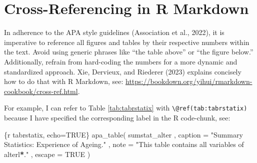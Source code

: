 \documentclass[
  doc]{apa6}
\newenvironment{Shaded}{\begin{snugshade}}{\end{snugshade}}
\newcommand{\AttributeTok}[1]{\textcolor[rgb]{0.13,0.29,0.53}{#1}}
\newcommand{\NormalTok}[1]{#1}
\newcommand{\SpecialCharTok}[1]{\textcolor[rgb]{0.81,0.36,0.00}{\textbf{#1}}}
\newcommand{\StringTok}[1]{\textcolor[rgb]{0.31,0.60,0.02}{#1}}
\begin{document}
\clearpage

\hypertarget{cross-referencing-in-r-markdown}{%
\section{Cross-Referencing in R Markdown}\label{cross-referencing-in-r-markdown}}

In adherence to the APA style guidelines (Association et al., 2022), it is imperative to reference all figures and tables by their respective numbers within the text. Avoid using generic phrases like ``the table above'' or ``the figure below.'' Additionally, refrain from hard-coding the numbers for a more dynamic and standardized approach. Xie, Dervieux, and Riederer (2023) explains concisely how to do that with R Markdown, see: \url{https://bookdown.org/yihui/rmarkdown-cookbook/cross-ref.html}.

For example, I can refer to Table \ref{tab:tabrstatix} with \texttt{\textbackslash{}@ref(tab:tabrstatix)} because I have specified the corresponding label in the R code-chunk, see:

\begin{Shaded}
\begin{Highlighting}[]
\StringTok{\textasciigrave{}\textasciigrave{}\textasciigrave{}}\AttributeTok{\{r tabrstatix, echo=TRUE\}}
\AttributeTok{apa\_table(}
\AttributeTok{  sumstat\_alter}
\AttributeTok{  , caption = "Summary Statistics: Experience of Ageing."}
\AttributeTok{  , note = "This table contains all variables of }\StringTok{\textasciigrave{}}\NormalTok{alterl}\SpecialCharTok{*}\StringTok{\textasciigrave{}}\AttributeTok{."}
\AttributeTok{  , escape = TRUE}
\AttributeTok{  )}
\StringTok{\textasciigrave{}\textasciigrave{}\textasciigrave{}}
\end{Highlighting}
\end{Shaded}
\end{document}
